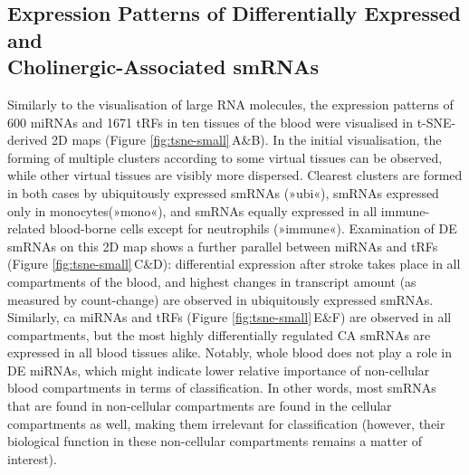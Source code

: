 \subsection{Expression Patterns of Differentially Expressed and\\ Cholinergic-Associated smRNAs}
Similarly to the visualisation of large RNA molecules, the expression patterns of 600 miRNAs and 1671 tRFs in ten tissues of the blood were visualised in t-SNE-derived 2D maps (Figure \ref{fig:tsne-small}\,A\&B). In the initial visualisation, the forming of multiple clusters according to some virtual tissues can be observed, while other virtual tissues are visibly more dispersed. Clearest clusters are formed in both cases by ubiquitously expressed smRNAs (»ubi«), smRNAs expressed only in monocytes(»mono«), and smRNAs equally expressed in all immune-related blood-borne cells except for neutrophils (»immune«). Examination of DE smRNAs on this 2D map shows a further parallel between miRNAs and tRFs (Figure \ref{fig:tsne-small}\,C\&D): differential expression after stroke takes place in all compartments of the blood, and highest changes in transcript amount (as measured by count-change) are observed in ubiquitously expressed smRNAs. Similarly, \ac{ca} miRNAs and tRFs (Figure \ref{fig:tsne-small}\,E\&F) are observed in all compartments, but the most highly differentially regulated CA smRNAs are expressed in all blood tissues alike. Notably, whole blood does not play a role in DE miRNAs, which might indicate lower relative importance of non-cellular blood compartments in terms of classification. In other words, most smRNAs that are found in non-cellular compartments are found in the cellular compartments as well, making them irrelevant for classification (however, their biological function in these non-cellular compartments remains a matter of interest).


